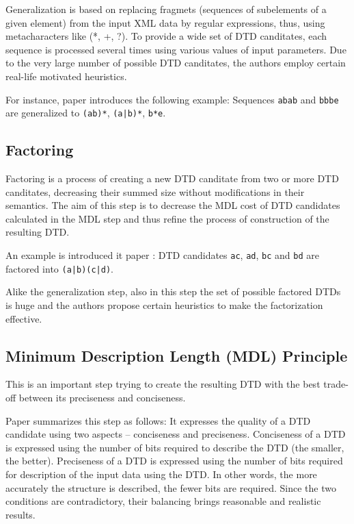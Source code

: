 Generalization is based on replacing fragmets (sequences of subelements of a given element) from the input XML data by regular expressions, thus, using metacharacters like (*, +, ?). To provide a wide set of DTD canditates, each sequence is processed several times using various values of input parameters. Due to the very large number of possible DTD canditates, the authors employ certain real-life motivated heuristics.

For instance, paper \cite{Garofalakis:2000:XSE:342009.335409} introduces the following example: Sequences \texttt{abab} and \texttt{bbbe} are generalized to \texttt{(ab)*}, \texttt{(a|b)*}, \texttt{b*e}.

\subsection{Factoring}
Factoring is a process of creating a new DTD canditate from two or more DTD canditates, decreasing their summed size without modifications in their semantics. The aim of this step is to decrease the MDL cost of DTD candidates calculated in the MDL step and thus refine the process of construction of the resulting DTD.

An example is introduced it paper \cite{Garofalakis:2000:XSE:342009.335409}: DTD candidates \texttt{ac}, \texttt{ad}, \texttt{bc} and \texttt{bd} are factored into \texttt{(a|b)(c|d)}.

Alike the generalization step, also in this step the set of possible factored DTDs is huge and the authors propose certain heuristics to make the factorization effective.

\subsection{Minimum Description Length (MDL) Principle}
This is an important step trying to create the resulting DTD with the best trade-off between its preciseness and conciseness.  

Paper \cite{Mlynkova:2008:AAX:1494650.1495496} summarizes this step as follows: It expresses the quality of a DTD candidate using two aspects – conciseness and preciseness. Conciseness of a DTD is expressed using the number of bits required to describe the DTD (the smaller, the better). Preciseness of a DTD is expressed using the number of bits required for description of the input data using the DTD. In other words, the more accurately the structure is described, the fewer bits are required. Since the two conditions are contradictory, their balancing brings reasonable and realistic results.

